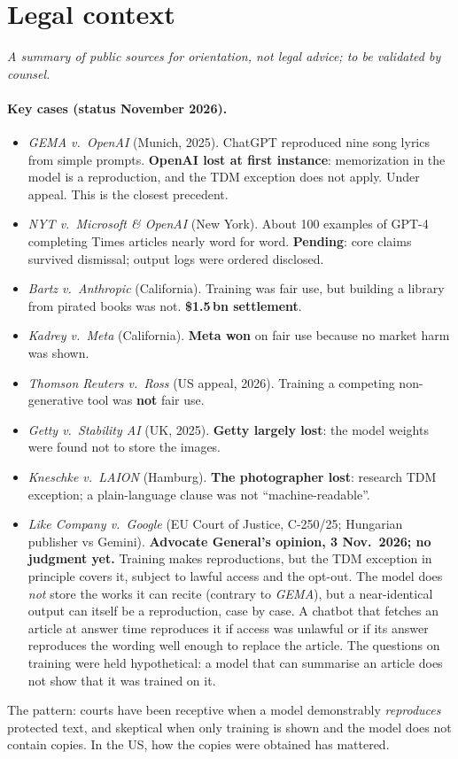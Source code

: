 \documentclass[10pt,a4paper]{article}
\begin{document}
\section{Legal context}\label{sec:legal}
\emph{A summary of public sources for orientation, not legal advice; to be validated by counsel.}

\paragraph{Key cases (status November 2026).}
\begin{itemize}
\item \emph{GEMA v.\ OpenAI} (Munich, 2025). ChatGPT reproduced nine song lyrics from simple prompts.
\textbf{OpenAI lost at first instance}: memorization in the model is a reproduction, and the TDM exception does not
apply. Under appeal. This is the closest precedent.
\item \emph{NYT v.\ Microsoft \& OpenAI} (New York). About 100 examples of GPT-4 completing Times articles nearly
word for word. \textbf{Pending}: core claims survived dismissal; output logs were ordered disclosed.
\item \emph{Bartz v.\ Anthropic} (California). Training was fair use, but building a library from pirated books
was not. \textbf{\$1.5\,bn settlement}.
\item \emph{Kadrey v.\ Meta} (California). \textbf{Meta won} on fair use because no market harm was shown.
\item \emph{Thomson Reuters v.\ Ross} (US appeal, 2026). Training a competing non-generative tool was \textbf{not}
fair use.
\item \emph{Getty v.\ Stability AI} (UK, 2025). \textbf{Getty largely lost}: the model weights were found not to store
the images.
\item \emph{Kneschke v.\ LAION} (Hamburg). \textbf{The photographer lost}: research TDM exception; a plain-language
clause was not ``machine-readable''.
\item \emph{Like Company v.\ Google} (EU Court of Justice, C-250/25; Hungarian publisher vs Gemini).
\textbf{Advocate General's opinion, 3 Nov.\ 2026; no judgment yet.} Training makes reproductions, but the TDM
exception in principle covers it, subject to lawful access and the opt-out. The model does \emph{not} store the works
it can recite (contrary to \emph{GEMA}), but a near-identical output can itself be a reproduction, case by case.
A chatbot that fetches an article at answer time reproduces it if access was unlawful or if its answer reproduces the
wording well enough to replace the article. The questions on training were held hypothetical: a model that can
summarise an article does not show that it was trained on it.
\end{itemize}
The pattern: courts have been receptive when a model demonstrably \emph{reproduces} protected text, and skeptical when
only training is shown and the model does not contain copies. In the US, how the copies were obtained has mattered.
\end{document}
